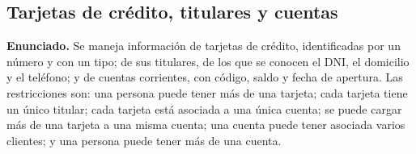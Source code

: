 %


\subsection{Tarjetas de crédito, titulares y cuentas}

\textbf{Enunciado.} Se maneja información de tarjetas de crédito, identificadas
por un número y con un tipo; de sus titulares, de los que se conocen el DNI, el
domicilio y el teléfono; y de cuentas corrientes, con código, saldo y fecha de
apertura. Las restricciones son: una persona puede tener más de una tarjeta;
cada tarjeta tiene un único titular; cada tarjeta está asociada a una única
cuenta; se puede cargar más de una tarjeta a una misma cuenta; una cuenta puede
tener asociada varios clientes; y una persona puede tener más de una cuenta.

